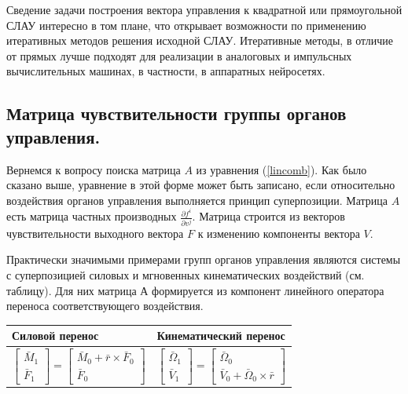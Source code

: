 Сведение задачи построения вектора управления к квадратной или прямоугольной СЛАУ интересно в том плане, что открывает возможности по применению итеративных методов решения исходной СЛАУ. Итеративные методы, в отличие от прямых лучше подходят для реализации в аналоговых и импульсных вычислительных машинах, в частности, в аппаратных нейросетях.

\subsection{Матрица чувствительности группы органов управления.}
Вернемся к вопросу поиска матрица $A$ из уравнения (\ref{lincomb}). Как было сказано выше, уравнение в этой форме может быть записано, если относительно воздействия органов управления выполняется принцип суперпозиции. Матрица $A$ есть матрица частных производных $\frac{\partial{f^i}}{\partial{v^j}}$. Матрица строится из векторов чувствительности выходного вектора $F$ к изменению компоненты вектора $V$.

Практически значимыми примерами групп органов управления являются системы с суперпозицией силовых и мгновенных кинематических воздействий (см. таблицу). Для них матрица $А$ формируется из компонент линейного оператора переноса соответствующего воздействия.

\begin{table}[ht]
	\centering
	\begin{tabular}{| p{7cm} | p{7cm} |}
		\hline
		Силовой перенос & Кинематический перенос \\
		\hline
		\begin{equation} \label{eq:ftrans}
		\begin{bmatrix} \bar{M}_1 \\ \bar{F}_1 \end{bmatrix} 
			= \begin{bmatrix} \bar{M}_0 + \bar{r} \times \bar{F}_0 \\ \bar{F}_0 \end{bmatrix}
		\end{equation}
		&
		\begin{equation} \label{eq:ctrans}
		\begin{bmatrix} \bar{\Omega}_1 \\ \bar{V}_1 \end{bmatrix} 
			= \begin{bmatrix} \bar{\Omega}_0 \\ \bar{V}_0 + \bar{\Omega}_0 \times \bar{r} \end{bmatrix}
		\end{equation}\\
		
		\hline
	\end{tabular}
\end{table}

